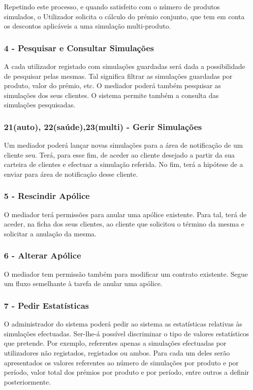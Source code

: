 Repetindo este processo, e quando satisfeito com o número de produtos simulados, o Utilizador solicita o cálculo do prémio conjunto, que tem em conta os descontos aplicáveis a uma simulação multi-produto.

\subsubsection{\textbf{4 - Pesquisar e Consultar Simulações}}
A cada utilizador registado com simulações guardadas será dada a possibilidade de pesquisar pelas mesmas. Tal significa filtrar as simulações guardadas por produto, valor do prémio, etc. O mediador poderá também pesquisar as simulações dos seus clientes. O sistema permite também a consulta das simulações pesquisadas.

\subsubsection{\textbf{21(auto), 22(saúde),23(multi) - Gerir Simulações}}
Um mediador poderá lançar novas simulações para a 
área de notificação de um cliente seu. Terá, para esse fim, de aceder ao cliente desejado a partir da sua carteira de clientes e efectuar a simulação referida. No fim, terá a hipótese de a enviar para área de notificação desse cliente.

\subsubsection{\textbf{5 - Rescindir Apólice}}
O mediador terá permissões para anular uma apólice existente. Para tal, terá de aceder, na ficha dos seus clientes, ao cliente que solicitou o término da mesma e solicitar a anulação da mesma.

\subsubsection{\textbf{6 - Alterar Apólice}}
O mediador tem permissão também para modificar um contrato existente. Segue um fluxo semelhante à tarefa de anular uma apólice.

\subsubsection{\textbf{7 - Pedir Estatísticas}}
O administrador do sistema poderá pedir ao sistema as estatísticas relativas às simulações efectuadas.  Ser-lhe-á possível discriminar o tipo de valores estatísticos que pretende. Por exemplo, referentes apenas a simulações efectuadas por utilizadores não registados, registados ou ambos. Para cada um deles serão apresentados os valores referentes ao número de simulações por produto e por período, valor total dos prémios por produto e por período, entre outros a definir posteriormente.

